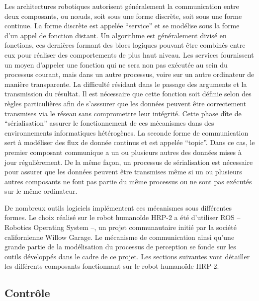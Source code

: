Les architectures robotiques autorisent généralement la communication
entre deux composants, ou n\oe uds, soit sous une forme discrète, soit
sous une forme continue. La forme discrète est appelée
``service'' et se modélise sous la forme d'un appel de
fonction distant. Un algorithme est généralement divisé en fonctions,
ces dernières formant des blocs logiques pouvant être combinés entre
eux pour réaliser des comportements de plus haut niveau. Les services
fournissent un moyen d'appeler une fonction qui ne sera non pas
exécutée au sein du processus courant, mais dans un autre processus,
voire sur un autre ordinateur de manière transparente. La difficulté
résidant dans le passage des arguments et la transmission du
résultat. Il est nécessaire que cette fonction soit définie selon des
règles particulières afin de s'asssurer que les données peuvent être
correctement transmises via le réseau sans compromettre leur
intégrité. Cette phase dîte de ``sérialisation''
assurer le fonctionnement de ces mécanismes dans des environnements
informatiques hétérogènes. La seconde forme de communication sert à
modéliser des flux de donnée continus et est appelée
``topic''. Dans ce cas, le premier composant communique a
un ou plusieurs autres des données mises à jour régulièrement. De la
même façon, un processus de sérialisation est nécessaire pour assurer
que les données peuvent être transmises même si un ou plusieurs autres
composants ne font pas partie du même processus ou ne sont pas
exécutés sur le même ordinateur.


De nombreux outils logiciels implémentent ces mécanismes sous
différentes formes. Le choix réalisé sur le robot humanoïde HRP-2 a
été d'utiliser ROS -- Robotics Operating System --, un
projet communautaire initié par la société californienne Willow
Garage. Le mécanisme de communication ainsi
qu'une grande partie de la modélisation du processus de perception se
fonde sur les outils développés dans le cadre de ce projet. Les
sections suivantes vont détailler les différents composants
fonctionnant sur le robot humanoïde HRP-2.



\subsection{Contrôle}


